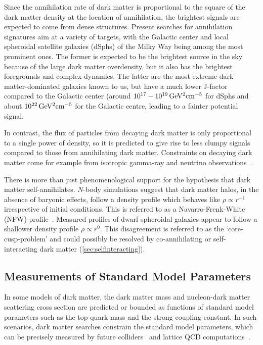 Since the annihilation rate of dark matter is proportional to the square of the dark matter density at the location of annihilation, the brightest signals are expected to come from dense structures. Present searches for annihilation signatures aim at a variety of targets, with the Galactic center and local spheroidal satellite galaxies (dSphs) of the Milky Way being among the most prominent ones. The former is expected to be the brightest source in the sky because of the large dark matter overdensity, but it also has the brightest foregrounds and complex dynamics. The latter are the most extreme dark matter-dominated galaxies known to us, but have a much lower J-factor~\cite{Abdalla:2016olq, Chiappo:2018mlt} compared to the Galactic center (around $10^{17}-10^{19}\,\rm GeV^2 cm^{-5}$ for dSphs and about $10^{22}\,\rm GeV^2 cm^{-5}$ for the Galactic centre, leading to a fainter potential signal. 

In contrast, the flux of particles from decaying dark matter is only proportional to a single power of density, so it is predicted to give rise to less clumpy signals compared to those from annihilating dark matter. Constraints on decaying dark matter come for example from isotropic gamma-ray and neutrino observations~\cite{Murase:2012xs, Blanco:2018esa}.

There is more than just phenomenological support for the hypothesis that dark matter self-annihilates. $N$-body simulations suggest that dark matter halos, in the absence of baryonic effects, follow a density profile which behaves like $\rho \propto r^{-1}$ irrespective of initial conditions. This is referred to as a Navarro-Frenk-White (NFW) profile~\cite{Navarro:1996gj, Navarro:1996bv}. Measured profiles of dwarf spheroidal galaxies appear to follow a shallower density profile $\rho \propto r^0$. This disagreement is referred to as the `core-cusp-problem' and could possibly be resolved by co-annihilating or self-interacting dark matter (\autoref{sec:selfinteracting}).

\subsection{Measurements of Standard Model Parameters}

In some models of dark matter, the dark matter mass and nucleon-dark matter scattering cross section are predicted or bounded as functions of standard model parameters such as the top quark mass and the strong coupling constant. In such scenarios, dark matter searches constrain the standard model parameters, which can be precisely measured by future colliders~\cite{Seidel:2013sqa,Horiguchi:2013wra,Kiyo:2015ooa,Beneke:2015kwa,Gomez-Ceballos:2013zzn} and lattice QCD computations~\cite{Lepage:2014fla}.

